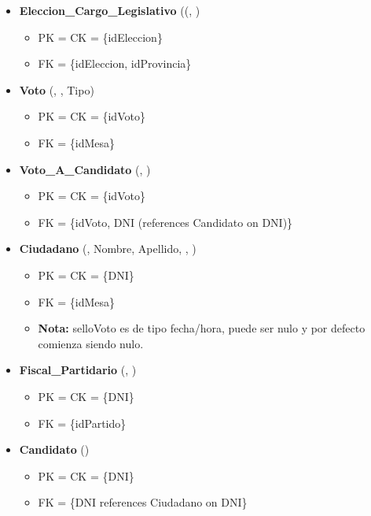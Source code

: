 \begin{itemize}
	\item \textbf{Eleccion\_Cargo\_Legislativo} ((, ) 
	\begin{itemize}
		\item PK = CK = \{idEleccion\}
		\item FK = \{idEleccion, idProvincia\}
	\end{itemize}
	\vspace{1mm}
	 

	\item \textbf{Voto} (, , Tipo) 
	\begin{itemize}
		\item PK = CK = \{idVoto\}
		\item FK = \{idMesa\}
	\end{itemize}
	\vspace{1mm}

	\item \textbf{Voto\_A\_Candidato} (, ) 
	\begin{itemize}
		\item PK = CK = \{idVoto\}
		\item FK = \{idVoto, DNI (references Candidato on DNI)\}
	\end{itemize}
	\vspace{1mm}

	\item \textbf{Ciudadano} (, Nombre, Apellido, , ) 
	\begin{itemize}
		\item PK = CK = \{DNI\}
		\item FK = \{idMesa\}
		\item \textbf{Nota:} selloVoto es de tipo fecha/hora, puede ser nulo y por defecto comienza siendo nulo.
	\end{itemize}
	\vspace{1mm}


	\item \textbf{Fiscal\_Partidario} (, ) 
	\begin{itemize}
		\item PK = CK = \{DNI\}
		\item FK = \{idPartido\}
	\end{itemize}
	\vspace{1mm}

	\item \textbf{Candidato} () 
	\begin{itemize}
		\item PK = CK = \{DNI\}
		\item FK = \{DNI references Ciudadano on DNI\}
	\end{itemize}
	\vspace{1mm}



\end{itemize}
